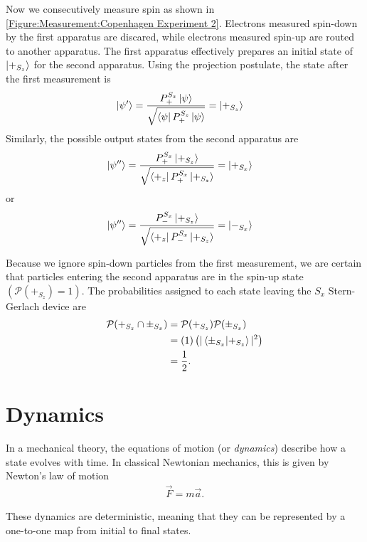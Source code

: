 Now we consecutively measure spin as shown in \autoref{Figure:Measurement:Copenhagen Experiment 2}. Electrons measured spin-down by the first apparatus are discared, while electrons measured spin-up are routed to another apparatus. The first apparatus effectively prepares an initial state of $\ket{+_{S_z}}$ for the second apparatus. Using the projection postulate, the state after the first measurement is
\begin{align}
    \ket{\psi^\prime} &= \frac{{P^{S_z}_+}\ket{\psi}}{\sqrt{\bra{\psi}P^{S_z}_+\ket{\psi}}} = \ket{+_{S_z}}
\end{align}
Similarly, the possible output states from the second apparatus are
\begin{align}
  \ket{\psi^{\prime\prime}} &= \frac{P^{S_x}_+\ket{+_{S_z}}}{\sqrt{\bra{+_z}P^{S_x}_+\ket{+_{S_z}}}} = \ket{+_{S_x}}
\end{align}
or
\begin{align}
  \ket{\psi^{\prime\prime}} &= \frac{P^{S_x}_-\ket{+_{S_z}}}{\sqrt{\bra{+_z}P^{S_x}_-\ket{+_{S_z}}}} = \ket{-_{S_x}}
\end{align}

Because we ignore spin-down particles from the first measurement, we are certain that particles entering the second apparatus are in the spin-up state $\left(\mathcal{P}(+_{S_z}) = 1 \right)$. The probabilities assigned to each state leaving the $S_x$ Stern-Gerlach device are
\begin{align} \label{eq:standard conditional probabilites}
    \mathcal{P}(+_{S_z} \cap \pm_{S_x}) &= \mathcal{P}(+_{S_z})\mathcal{P}(\pm_{S_x})  \\ \nonumber
    &= (1)\left(|\braket{\pm_{S_x}|+_{S_z}}|^2\right) \\ \nonumber
    &= \frac{1}{2} .
\end{align}

\section{Dynamics}
In a mechanical theory, the equations of motion (or \textit{dynamics}) describe how a state evolves with time. In classical Newtonian mechanics, this is given by Newton's law of motion
\begin{align}
  \vec{F} = m\vec{a}.
\end{align}

These dynamics are deterministic, meaning that they can be represented by a one-to-one map from initial to final states.

